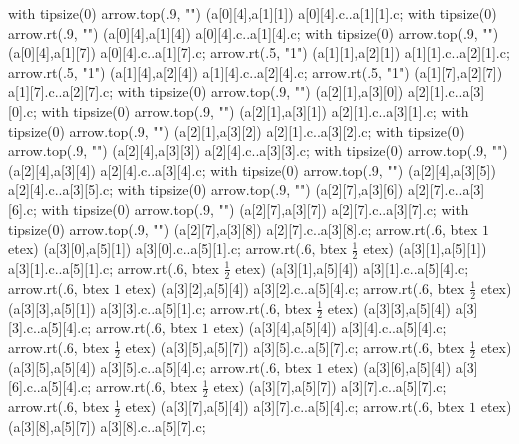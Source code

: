     with tipsize(0) arrow.top(.9, "") (a[0][4],a[1][1]) a[0][4].c..a[1][1].c;
    with tipsize(0) arrow.rt(.9, "") (a[0][4],a[1][4]) a[0][4].c..a[1][4].c;
    with tipsize(0) arrow.top(.9, "") (a[0][4],a[1][7]) a[0][4].c..a[1][7].c;
    arrow.rt(.5, "1") (a[1][1],a[2][1]) a[1][1].c..a[2][1].c;
    arrow.rt(.5, "1") (a[1][4],a[2][4]) a[1][4].c..a[2][4].c;
    arrow.rt(.5, "1") (a[1][7],a[2][7]) a[1][7].c..a[2][7].c;
    with tipsize(0) arrow.top(.9, "") (a[2][1],a[3][0]) a[2][1].c..a[3][0].c;
    with tipsize(0) arrow.top(.9, "") (a[2][1],a[3][1]) a[2][1].c..a[3][1].c;
    with tipsize(0) arrow.top(.9, "") (a[2][1],a[3][2]) a[2][1].c..a[3][2].c;
    with tipsize(0) arrow.top(.9, "") (a[2][4],a[3][3]) a[2][4].c..a[3][3].c;
    with tipsize(0) arrow.top(.9, "") (a[2][4],a[3][4]) a[2][4].c..a[3][4].c;
    with tipsize(0) arrow.top(.9, "") (a[2][4],a[3][5]) a[2][4].c..a[3][5].c;
    with tipsize(0) arrow.top(.9, "") (a[2][7],a[3][6]) a[2][7].c..a[3][6].c;
    with tipsize(0) arrow.top(.9, "") (a[2][7],a[3][7]) a[2][7].c..a[3][7].c;
    with tipsize(0) arrow.top(.9, "") (a[2][7],a[3][8]) a[2][7].c..a[3][8].c;
    arrow.rt(.6, btex $1$ etex) (a[3][0],a[5][1]) a[3][0].c..a[5][1].c;
    arrow.rt(.6, btex $\frac{1}{2}$ etex) (a[3][1],a[5][1]) a[3][1].c..a[5][1].c;
    arrow.rt(.6, btex $\frac{1}{2}$ etex) (a[3][1],a[5][4]) a[3][1].c..a[5][4].c;
    arrow.rt(.6, btex $1$ etex) (a[3][2],a[5][4]) a[3][2].c..a[5][4].c;
    arrow.rt(.6, btex $\frac{1}{2}$ etex) (a[3][3],a[5][1]) a[3][3].c..a[5][1].c;
    arrow.rt(.6, btex $\frac{1}{2}$ etex) (a[3][3],a[5][4]) a[3][3].c..a[5][4].c;
    arrow.rt(.6, btex $1$ etex) (a[3][4],a[5][4]) a[3][4].c..a[5][4].c;
    arrow.rt(.6, btex $\frac{1}{2}$ etex) (a[3][5],a[5][7]) a[3][5].c..a[5][7].c;
    arrow.rt(.6, btex $\frac{1}{2}$ etex) (a[3][5],a[5][4]) a[3][5].c..a[5][4].c;
    arrow.rt(.6, btex $1$ etex) (a[3][6],a[5][4]) a[3][6].c..a[5][4].c;
    arrow.rt(.6, btex $\frac{1}{2}$ etex) (a[3][7],a[5][7]) a[3][7].c..a[5][7].c;
    arrow.rt(.6, btex $\frac{1}{2}$ etex) (a[3][7],a[5][4]) a[3][7].c..a[5][4].c;
    arrow.rt(.6, btex $1$ etex) (a[3][8],a[5][7]) a[3][8].c..a[5][7].c;
\stopreusableMPgraphic


